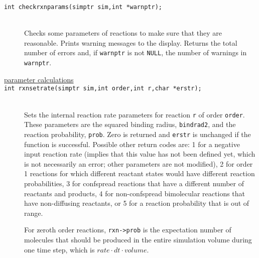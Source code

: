 \documentclass {book}
\begin{document}
\begin{description}
\item[\texttt{int checkrxnparams(simptr sim,int *warnptr);}]
\hfill \\
Checks some parameters of reactions to make sure that they are reasonable.  Prints warning messages to the display.  Returns the total number of errors and, if \texttt{warnptr} is not \texttt{NULL}, the number of warnings in \texttt{warnptr}.

\item[\underline{parameter calculations}]

\item[\texttt{int rxnsetrate(simptr sim,int order,int r,char *erstr);}]
\hfill \\
Sets the internal reaction rate parameters for reaction \texttt{r} of order \texttt{order}.  These parameters are the squared binding radius, \texttt{bindrad2}, and the reaction probability, \texttt{prob}.  Zero is returned and \texttt{erstr} is unchanged if the function is successful.  Possible other return codes are: 1 for a negative input reaction rate (implies that this value has not been defined yet, which is not necessarily an error; other parameters are not modified), 2 for order 1 reactions for which different reactant states would have different reaction probabilities, 3 for confspread reactions that have a different number of reactants and products, 4 for non-confspread bimolecular reactions that have non-diffusing reactants, or 5 for a reaction probability that is out of range.

For zeroth order reactions, \texttt{rxn->prob} is the expectation number of molecules that should be produced in the entire simulation volume during one time step, which is $rate \cdot dt \cdot volume$.


\end{description}
\end{document}
